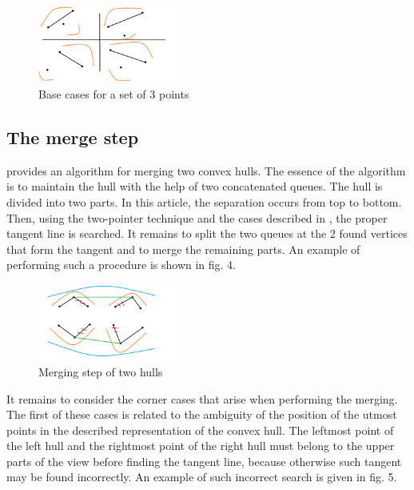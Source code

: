 \documentclass[conference]{IEEEtran}
\theoremstyle{plane}
\begin{document}
\begin{figure}[htbp]
	\centerline{\includegraphics[width=0.4\textwidth, height=0.2\textheight]{base_case_3}}
	\caption{Base cases for a set of 3 points}
	\label{base_case_3}
\end{figure}


\subsection{The merge step}

\cite{overmars} provides an algorithm for merging two convex hulls. The essence of the algorithm is to maintain the hull with the help of two concatenated queues. The hull is divided into two parts. In this article, the separation occurs from top to bottom. Then, using the two-pointer technique and the cases described in \cite{overmars}, the proper tangent line is searched. It remains to split the two queues at the 2 found vertices that form the tangent and to merge the remaining parts. An example of performing such a procedure is shown in fig. 4.

\begin{figure}[htbp]
	\centerline{\includegraphics[width=0.4\textwidth, height=0.2\textheight]{ch_union}}
	\caption{Merging step of two hulls}
	\label{ch_union}
\end{figure}

It remains to consider the corner cases that arise when performing the merging. The first of these cases is related to the ambiguity of the position of the utmost points in the described representation of the convex hull. The leftmost point of the left hull and the rightmost point of the right hull must belong to the upper parts of the view before finding the tangent line, because otherwise such tangent may be found incorrectly. An example of such incorrect search is given in fig. 5.
\end{document}
